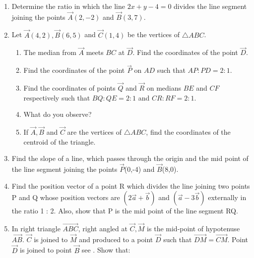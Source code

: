 \begin{enumerate}[label=\thesection.\arabic*,ref=\thesection.\theenumi]
\\
\solution
		
\item Determine the ratio in which the line $2x+y  - 4=0$ divides the line segment joining the points $\vec{A}(2, - 2)$  and  $\vec{B}(3, 7)$.
\\
\solution
	
\item Let $\vec{A}(4, 2), \vec{B}(6, 5)$  and $ \vec{C}(1, 4)$ be the vertices of $\triangle ABC$.
\begin{enumerate}
\item The median from $\vec{A}$ meets $BC$ at $\vec{D}$. Find the coordinates of the point $\vec{D}$.
\item Find the coordinates of the point $\vec{P}$ on $AD$ such that $AP : PD = 2 : 1$.
\item Find the coordinates of points $\vec{Q}$ and $\vec{R}$ on medians $BE$ and $CF$ respectively such that $BQ : QE = 2 : 1$  and  $CR : RF = 2 : 1$.
\item What do you observe?
\item If $\vec{A}, \vec{B}$ and $\vec{C}$  are the vertices of $\triangle ABC$, find the coordinates of the centroid of the triangle.
\end{enumerate}
\solution
	
\item Find the slope of a line, which passes through the origin and the mid point of the line segment joining the points $\vec{P}$(0,-4) and $\vec{B}$(8,0).
\label{chapters/11/10/1/5}

\item Find the position vector of a point R which divides the line joining two points P and Q whose position vectors are $(2\vec{a}+\vec{b})$ and $(\vec{a}-3\vec{b})$
externally in the ratio 1 : 2. Also, show that P is the mid point of the line segment RQ.\\
	\solution
%		
\item In right triangle $\vec{ABC}$, right angled at $\vec{C}, \vec{M}$ is the mid-point of hypotenuse $\vec{AB}$. $\vec{C}$ is joined to $\vec{M}$ and produced to a point $\vec{D}$ such that $\vec{DM}=\vec{CM}$. Point $\vec{D}$ is joined to point $\vec{B}$ see . Show that:
\begin{figure}[H]
\centering

\end{figure}
\end{enumerate}
